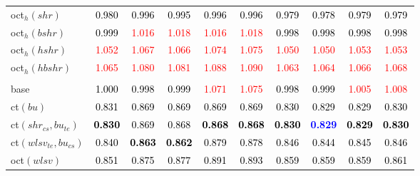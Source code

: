 \begin{tabular}[t]{l|ccccccccc}
oct$_h(shr)$ & \textcolor{black}{0.980} & \textcolor{black}{0.996} & \textcolor{black}{0.995} & \textcolor{black}{0.996} & \textcolor{black}{0.996} & \textcolor{black}{0.979} & \textcolor{black}{0.978} & \textcolor{black}{0.979} & \textcolor{black}{0.979}\\
oct$_h(bshr)$ & \textcolor{black}{0.999} & \textcolor{red}{1.016} & \textcolor{red}{1.018} & \textcolor{red}{1.016} & \textcolor{red}{1.018} & \textcolor{black}{0.998} & \textcolor{black}{0.998} & \textcolor{black}{0.998} & \textcolor{black}{0.998}\\
oct$_h(hshr)$ & \textcolor{red}{1.052} & \textcolor{red}{1.067} & \textcolor{red}{1.066} & \textcolor{red}{1.074} & \textcolor{red}{1.075} & \textcolor{red}{1.050} & \textcolor{red}{1.050} & \textcolor{red}{1.053} & \textcolor{red}{1.053}\\
oct$_h(hbshr)$ & \textcolor{red}{1.065} & \textcolor{red}{1.080} & \textcolor{red}{1.081} & \textcolor{red}{1.088} & \textcolor{red}{1.090} & \textcolor{red}{1.063} & \textcolor{red}{1.064} & \textcolor{red}{1.066} & \textcolor{red}{1.068}\\
\addlinespace[0.3em]
\multicolumn{10}{c}{\textbf{$k = 2$}}\\
base & \textcolor{black}{1.000} & \textcolor{black}{0.998} & \textcolor{black}{0.999} & \textcolor{red}{1.071} & \textcolor{red}{1.075} & \textcolor{black}{0.998} & \textcolor{black}{0.999} & \textcolor{red}{1.005} & \textcolor{red}{1.008}\\
ct$(bu)$ & \textcolor{black}{0.831} & \textcolor{black}{0.869} & \textcolor{black}{0.869} & \textcolor{black}{0.869} & \textcolor{black}{0.869} & \textcolor{black}{0.830} & \textcolor{black}{0.829} & \textcolor{black}{0.829} & \textcolor{black}{0.830}\\
ct$(shr_{cs}, bu_{te})$ & \textcolor{black}{\textbf{0.830}} & \textcolor{black}{0.869} & \textcolor{black}{0.868} & \textcolor{black}{\textbf{0.868}} & \textcolor{black}{\textbf{0.868}} & \textcolor{black}{\textbf{0.830}} & \textcolor{blue}{\textbf{0.829}} & \textcolor{black}{\textbf{0.829}} & \textcolor{black}{\textbf{0.830}}\\
ct$(wlsv_{te}, bu_{cs})$ & \textcolor{black}{0.840} & \textcolor{black}{\textbf{0.863}} & \textcolor{black}{\textbf{0.862}} & \textcolor{black}{0.879} & \textcolor{black}{0.878} & \textcolor{black}{0.846} & \textcolor{black}{0.844} & \textcolor{black}{0.845} & \textcolor{black}{0.846}\\
oct$(wlsv)$ & \textcolor{black}{0.851} & \textcolor{black}{0.875} & \textcolor{black}{0.877} & \textcolor{black}{0.891} & \textcolor{black}{0.893} & \textcolor{black}{0.859} & \textcolor{black}{0.859} & \textcolor{black}{0.859} & \textcolor{black}{0.861}\\

\end{tabular}

